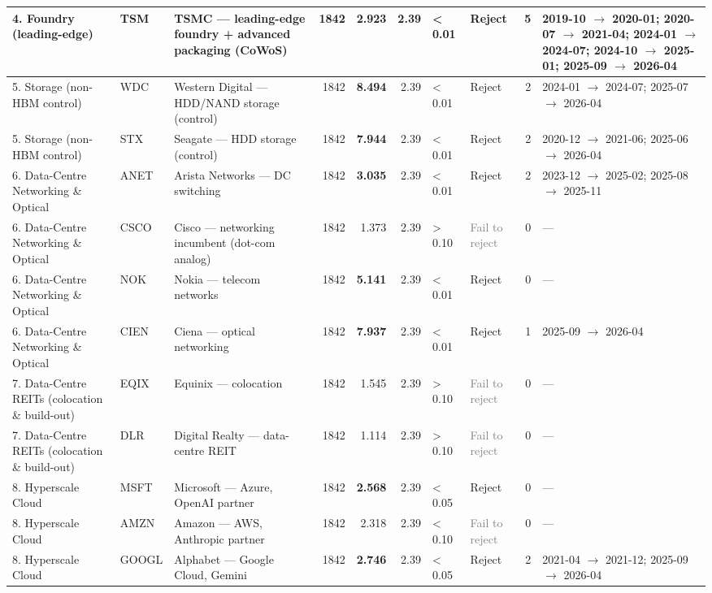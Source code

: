 \begin{table}[htbp]
\begin{tabular}{llp{3.8cm}rrrllrp{4cm}}
4. Foundry (leading-edge) & TSM & TSMC --- leading-edge foundry + advanced packaging (CoWoS) & 1842 & \textbf{2.923} & 2.39 & < 0.01 & \textcolor{red!60!black}{Reject} & 5 & 2019-10 $\to$ 2020-01; 2020-07 $\to$ 2021-04; 2024-01 $\to$ 2024-07; 2024-10 $\to$ 2025-01; 2025-09 $\to$ 2026-04 \\
\midrule
5. Storage (non-HBM control) & WDC & Western Digital --- HDD/NAND storage (control) & 1842 & \textbf{8.494} & 2.39 & < 0.01 & \textcolor{red!60!black}{Reject} & 2 & 2024-01 $\to$ 2024-07; 2025-07 $\to$ 2026-04 \\
5. Storage (non-HBM control) & STX & Seagate --- HDD storage (control) & 1842 & \textbf{7.944} & 2.39 & < 0.01 & \textcolor{red!60!black}{Reject} & 2 & 2020-12 $\to$ 2021-06; 2025-06 $\to$ 2026-04 \\
\midrule
6. Data-Centre Networking \& Optical & ANET & Arista Networks --- DC switching & 1842 & \textbf{3.035} & 2.39 & < 0.01 & \textcolor{red!60!black}{Reject} & 2 & 2023-12 $\to$ 2025-02; 2025-08 $\to$ 2025-11 \\
6. Data-Centre Networking \& Optical & CSCO & Cisco --- networking incumbent (dot-com analog) & 1842 & 1.373 & 2.39 & > 0.10 & \textcolor{gray}{Fail to reject} & 0 & --- \\
6. Data-Centre Networking \& Optical & NOK & Nokia --- telecom networks & 1842 & \textbf{5.141} & 2.39 & < 0.01 & \textcolor{red!60!black}{Reject} & 0 & --- \\
6. Data-Centre Networking \& Optical & CIEN & Ciena --- optical networking & 1842 & \textbf{7.937} & 2.39 & < 0.01 & \textcolor{red!60!black}{Reject} & 1 & 2025-09 $\to$ 2026-04 \\
\midrule
7. Data-Centre REITs (colocation \& build-out) & EQIX & Equinix --- colocation & 1842 & 1.545 & 2.39 & > 0.10 & \textcolor{gray}{Fail to reject} & 0 & --- \\
7. Data-Centre REITs (colocation \& build-out) & DLR & Digital Realty --- data-centre REIT & 1842 & 1.114 & 2.39 & > 0.10 & \textcolor{gray}{Fail to reject} & 0 & --- \\
\midrule
8. Hyperscale Cloud & MSFT & Microsoft --- Azure, OpenAI partner & 1842 & \textbf{2.568} & 2.39 & < 0.05 & \textcolor{red!60!black}{Reject} & 0 & --- \\
8. Hyperscale Cloud & AMZN & Amazon --- AWS, Anthropic partner & 1842 & 2.318 & 2.39 & < 0.10 & \textcolor{gray}{Fail to reject} & 0 & --- \\
8. Hyperscale Cloud & GOOGL & Alphabet --- Google Cloud, Gemini & 1842 & \textbf{2.746} & 2.39 & < 0.05 & \textcolor{red!60!black}{Reject} & 2 & 2021-04 $\to$ 2021-12; 2025-09 $\to$ 2026-04 \\

\end{tabular}
\end{table}
